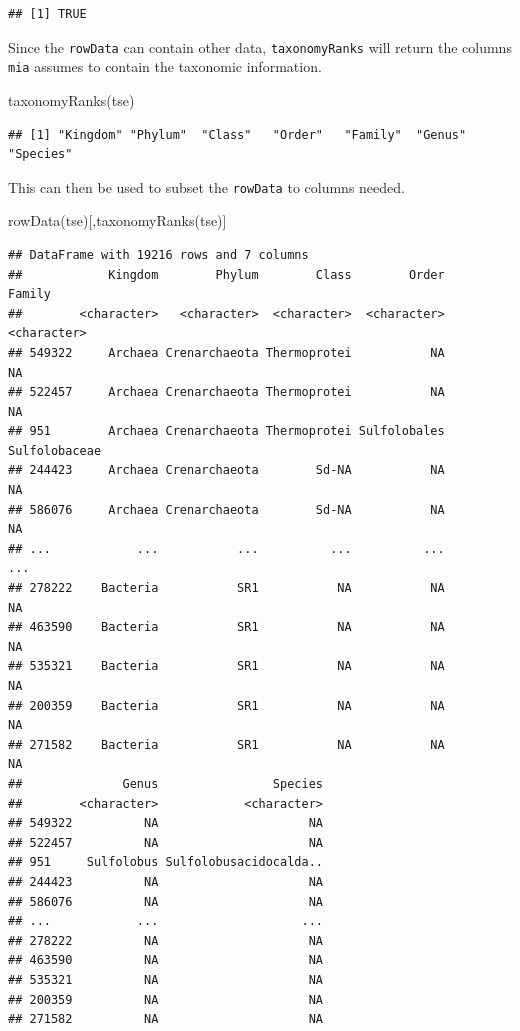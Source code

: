 \documentclass[
]{book}
\newenvironment{Shaded}{\begin{snugshade}}{\end{snugshade}}
\newcommand{\FunctionTok}[1]{\textcolor[rgb]{0.00,0.00,0.00}{#1}}
\newcommand{\NormalTok}[1]{#1}
\begin{document}
\begin{verbatim}
## [1] TRUE
\end{verbatim}

Since the \texttt{rowData} can contain other data, \texttt{taxonomyRanks} will return the
columns \texttt{mia} assumes to contain the taxonomic information.

\begin{Shaded}
\begin{Highlighting}[]
\FunctionTok{taxonomyRanks}\NormalTok{(tse)}
\end{Highlighting}
\end{Shaded}

\begin{verbatim}
## [1] "Kingdom" "Phylum"  "Class"   "Order"   "Family"  "Genus"   "Species"
\end{verbatim}

This can then be used to subset the \texttt{rowData} to columns needed.

\begin{Shaded}
\begin{Highlighting}[]
\FunctionTok{rowData}\NormalTok{(tse)[,}\FunctionTok{taxonomyRanks}\NormalTok{(tse)]}
\end{Highlighting}
\end{Shaded}

\begin{verbatim}
## DataFrame with 19216 rows and 7 columns
##            Kingdom        Phylum        Class        Order        Family
##        <character>   <character>  <character>  <character>   <character>
## 549322     Archaea Crenarchaeota Thermoprotei           NA            NA
## 522457     Archaea Crenarchaeota Thermoprotei           NA            NA
## 951        Archaea Crenarchaeota Thermoprotei Sulfolobales Sulfolobaceae
## 244423     Archaea Crenarchaeota        Sd-NA           NA            NA
## 586076     Archaea Crenarchaeota        Sd-NA           NA            NA
## ...            ...           ...          ...          ...           ...
## 278222    Bacteria           SR1           NA           NA            NA
## 463590    Bacteria           SR1           NA           NA            NA
## 535321    Bacteria           SR1           NA           NA            NA
## 200359    Bacteria           SR1           NA           NA            NA
## 271582    Bacteria           SR1           NA           NA            NA
##              Genus                Species
##        <character>            <character>
## 549322          NA                     NA
## 522457          NA                     NA
## 951     Sulfolobus Sulfolobusacidocalda..
## 244423          NA                     NA
## 586076          NA                     NA
## ...            ...                    ...
## 278222          NA                     NA
## 463590          NA                     NA
## 535321          NA                     NA
## 200359          NA                     NA
## 271582          NA                     NA
\end{verbatim}
\end{document}
